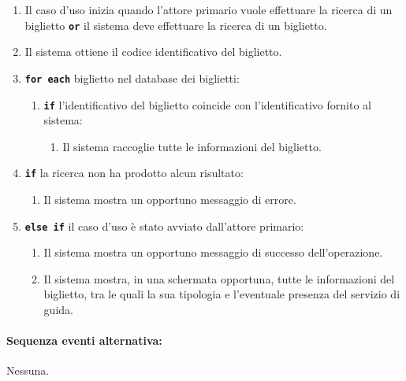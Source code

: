 \documentclass{article}
\begin{document}
		\begin{enumerate}[itemsep=8pt,parsep=0pt]
		
				\item Il caso d'uso inizia quando l'attore primario vuole effettuare la ricerca di un biglietto \texttt{\textbf{or}} il sistema deve effettuare la ricerca di un biglietto.
		
				\item Il sistema ottiene il codice identificativo del biglietto.

				\item \texttt{\textbf{for each}} biglietto nel database dei biglietti:
					\begin{enumerate}	[leftmargin=28pt]
						\item \texttt{\textbf{if}} l'identificativo del biglietto coincide con l'identificativo fornito al sistema:
							\begin{enumerate}	[leftmargin=28pt]
								\item Il sistema raccoglie tutte le informazioni del biglietto.
				  			\end{enumerate}
		  			\end{enumerate}	

				\item \texttt{\textbf{if}} la ricerca non ha prodotto alcun risultato:
					\begin{enumerate}	[leftmargin=28pt]
						\item Il sistema mostra un opportuno messaggio di errore.
		  			\end{enumerate}
				\item \texttt{\textbf{else if}} il caso d'uso è stato avviato dall'attore primario:
					\begin{enumerate}	[leftmargin=28pt]
						\item Il sistema mostra un opportuno messaggio di successo dell'operazione.
						\item Il sistema mostra, in una schermata opportuna, tutte le informazioni del biglietto, tra le quali la sua tipologia e l'eventuale presenza del servizio di guida.
					\end{enumerate}
				
		\end{enumerate}	
	
	\paragraph{Sequenza eventi alternativa:} Nessuna.
\end{document}
